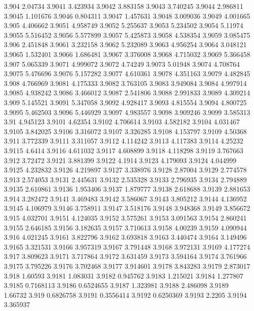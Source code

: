 3.904  2.04734
3.9041  3.423934
3.9042  3.883158
3.9043  3.740245
3.9044  2.986811
3.9045  1.101676
3.9046  0.804311
3.9047  1.457631
3.9048  3.009036
3.9049  4.001665
3.905  4.406662
3.9051  4.958749
3.9052  5.255637
3.9053  5.234502
3.9054  5.11974
3.9055  5.516452
3.9056  5.577899
3.9057  5.425873
3.9058  4.538354
3.9059  3.085475
3.906  2.451848
3.9061  3.232158
3.9062  5.232089
3.9063  4.956254
3.9064  3.048121
3.9065  1.532401
3.9066  1.686481
3.9067  3.376008
3.9068  4.715032
3.9069  5.366458
3.907  5.065339
3.9071  4.999072
3.9072  4.74249
3.9073  5.01948
3.9074  4.708764
3.9075  5.476696
3.9076  5.157282
3.9077  4.610361
3.9078  4.351163
3.9079  4.482845
3.908  4.766969
3.9081  4.175333
3.9082  3.763105
3.9083  3.949084
3.9084  4.997914
3.9085  4.938242
3.9086  3.466012
3.9087  2.541806
3.9088  2.991833
3.9089  4.309214
3.909  5.145521
3.9091  5.347058
3.9092  4.928417
3.9093  4.815554
3.9094  4.800725
3.9095  5.462503
3.9096  5.446929
3.9097  4.983557
3.9098  3.909246
3.9099  3.585313
3.91  4.945123
3.9101  4.62354
3.9102  4.706614
3.9103  4.582182
3.9104  4.031467
3.9105  3.842025
3.9106  3.316072
3.9107  3.326285
3.9108  4.153797
3.9109  4.50368
3.911  3.772339
3.9111  3.311057
3.9112  4.114242
3.9113  4.117383
3.9114  4.25232
3.9115  4.6414
3.9116  4.611032
3.9117  4.608899
3.9118  4.118298
3.9119  3.767663
3.912  3.72472
3.9121  3.881399
3.9122  4.1914
3.9123  4.179093
3.9124  4.044999
3.9125  4.232832
3.9126  4.219897
3.9127  3.338976
3.9128  2.87004
3.9129  2.774578
3.913  2.574053
3.9131  2.445631
3.9132  2.535328
3.9133  2.796935
3.9134  2.794889
3.9135  2.610861
3.9136  1.953406
3.9137  1.879777
3.9138  2.618688
3.9139  2.881653
3.914  3.282472
3.9141  3.469483
3.9142  3.586067
3.9143  3.805212
3.9144  4.136952
3.9145  4.106979
3.9146  3.758911
3.9147  3.518176
3.9148  3.948368
3.9149  3.856672
3.915  4.032701
3.9151  4.124035
3.9152  3.575261
3.9153  3.091563
3.9154  2.860241
3.9155  2.646185
3.9156  3.182635
3.9157  3.710613
3.9158  4.00239
3.9159  4.090944
3.916  4.021245
3.9161  3.822796
3.9162  3.693818
3.9163  3.440474
3.9164  3.149496
3.9165  3.321531
3.9166  3.957319
3.9167  3.791448
3.9168  3.972131
3.9169  4.177274
3.917  3.809623
3.9171  3.717864
3.9172  3.631459
3.9173  3.594164
3.9174  3.761966
3.9175  3.795226
3.9176  3.702468
3.9177  3.914601
3.9178  3.843283
3.9179  2.873017
3.918  1.60593
3.9181  1.083031
3.9182  0.945762
3.9183  1.215021
3.9184  1.277807
3.9185  0.7168113
3.9186  0.6524655
3.9187  1.323981
3.9188  2.486098
3.9189  1.66732
3.919  0.6826758
3.9191  0.3556414
3.9192  0.6250369
3.9193  2.2205
3.9194  3.365937
